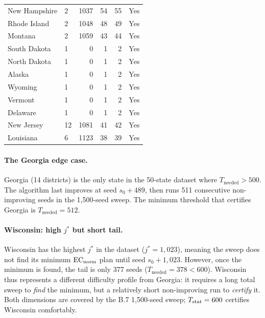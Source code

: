 \begin{longtable}{llrrrc}
New Hampshire           & 2  & 1037 &  54 &  55 & Yes \\
Rhode Island            & 2  & 1048 &  48 &  49 & Yes \\
Montana                 & 2  & 1059 &  43 &  44 & Yes \\
South Dakota            & 1  &    0 &   1 &   2 & Yes \\
North Dakota            & 1  &    0 &   1 &   2 & Yes \\
Alaska                  & 1  &    0 &   1 &   2 & Yes \\
Wyoming                 & 1  &    0 &   1 &   2 & Yes \\
Vermont                 & 1  &    0 &   1 &   2 & Yes \\
Delaware                & 1  &    0 &   1 &   2 & Yes \\
New Jersey              & 12 & 1081 &  41 &  42 & Yes \\
Louisiana               & 6  & 1123 &  38 &  39 & Yes \\
\end{longtable}


\paragraph{The Georgia edge case.}
Georgia (14 districts) is the only state in the 50-state dataset where
$T_{\mathrm{needed}} > 500$.
The algorithm last improves at seed $s_0 + 489$, then runs 511 consecutive
non-improving seeds in the 1{,}500-seed sweep.
The minimum threshold that certifies Georgia is $T_{\mathrm{needed}} = 512$.

\paragraph{Wisconsin: high $j^*$ but short tail.}
Wisconsin has the highest $j^*$ in the dataset ($j^* = 1{,}023$), meaning
the sweep does not find its minimum $\mathrm{EC}_{\mathrm{norm}}$ plan until seed $s_0 + 1{,}023$.
However, once the minimum is found, the tail is only 377 seeds
($T_{\mathrm{needed}} = 378 < 600$).
Wisconsin thus represents a different difficulty profile from Georgia: it
requires a long total sweep to \emph{find} the minimum, but a relatively
short non-improving run to \emph{certify} it.
Both dimensions are covered by the B.7 1{,}500-seed sweep; $T_{\mathrm{stat}} = 600$
certifies Wisconsin comfortably.

